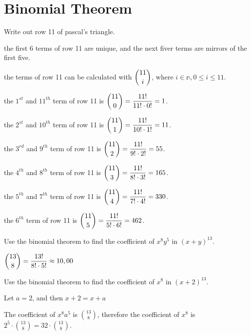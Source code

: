 \documentclass[openany, 11pt]{book}
\begin{document}
\section{Binomial Theorem}
\begin{exercise}{}{}
	Write out row 11 of pascal's triangle.
	\begin{alist}
		\item the first 6 terms of row 11 are unique, and the next fiver terms are mirrors of
		the first five.
		\item the terms of row 11 can be calculated with $\dbinom{11}{i}$, where $i
			\in \mathbb{n}, 0 \leq i \leq 11$.
		\item the $1^{st}$ and $11^{th}$ term of row 11 is
		$\dbinom{11}{0}=\dfrac{11!}{11!\cdot0!}=1$.
		\item the $2^{st}$ and $10^{th}$ term of row 11 is
		$\dbinom{11}{1}=\dfrac{11!}{10!\cdot1!}=11$.
		\item the $3^{rd}$ and $9^{th}$ term of row 11 is
		$\dbinom{11}{2}=\dfrac{11!}{9!\cdot2!}=55$.
		\item the $4^{th}$ and $8^{th}$ term of row 11 is
		$\dbinom{11}{3}=\dfrac{11!}{8!\cdot3!}=165$.
		\item the $5^{th}$ and $7^{th}$ term of row 11 is
		$\dbinom{11}{4}=\dfrac{11!}{7!\cdot4!}=330$.
		\item the $6^{th}$ term of row 11 is
		$\dbinom{11}{5}=\dfrac{11!}{5!\cdot6!}=462$.
	\end{alist}
\end{exercise}

\begin{exercise}{}{}
	Use the binomial theorem to find the coefficient of $x^8 y^5$
	in $(x+ y)^{13}$.
	\begin{alist}
		\item $\dbinom{13}{8}=\dfrac{13!}{8!\cdot5!}\approx 10,00$
	\end{alist}
\end{exercise}

\begin{exercise}{}{}
	Use the binomial theorem to find the coefficient of $x^8$
	in $(x+2)^{13}$.
	\begin{alist}
		\item Let $a=2$, and then $x+2=x+a$
		\item The coefficient of $x^8a^5$ is $\binom{13}{8}$, therefore the coefficient
		of $x^8$ is $2^5\cdot\binom{13}{8}=32\cdot\binom{13}{8}$.
	\end{alist}
\end{exercise}
\end{document}
